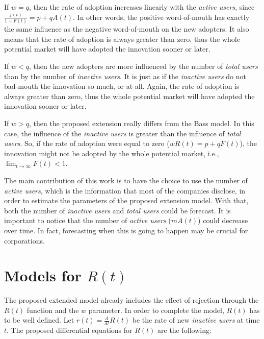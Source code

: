 If $w = q$, then the rate of adoption increases linearly with the \textit{active users}, since $\frac{f(t)}{1-F(t)} = p + qA(t)$. In other words, the positive word-of-mouth has exactly the same influence as the negative word-of-mouth on the new adopters. It also means that the rate of adoption is always greater than zero, thus the whole potential market will have adopted the innovation sooner or later.

If $w < q$, then the new adopters are more influenced by the number of \textit{total users} than by the number of \textit{inactive users}. It is just as if the \textit{inactive users} do not bad-mouth the innovation so much, or at all. Again, the rate of adoption is always greater than zero, thus the whole potential market will have adopted the innovation sooner or later.

If $w > q$, then the proposed extension really differs from the Bass model. In this case, the influence of the \textit{inactive users} is greater than the influence of \textit{total users}. So, if the rate of adoption were equal to zero ($wR(t) = p + qF(t)$), the innovation might not be adopted by the whole potential market, i.e., $\lim_{t \rightarrow \infty} F(t) < 1$.

The main contribution of this work is to have the choice to use the number of \textit{active users}, which is the information that most of the companies disclose, in order to estimate the parameters of the proposed extension model. With that, both the number of \textit{inactive users} and \textit{total users} could be forecast. It is important to notice that the number of \textit{active users} ($mA(t)$) could decrease over time. In fact, forecasting when this is going to happen may be crucial for corporations.


\chapter{Models for $R(t)$}

The proposed extended model already includes the effect of rejection through the $R(t)$ function and the $w$ parameter. In order to complete the model, $R(t)$ has to be well defined. Let $r(t) = \frac{d}{dt} R(t)$ be the rate of new \textit{inactive users} at time $t$. The proposed differential equations for $R(t)$ are the following:


